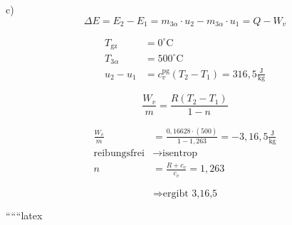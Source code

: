 c) 
\[
\Delta E = E_2 - E_1 = m_{3\alpha} \cdot u_2 - m_{3\alpha} \cdot u_1 = Q - W_v
\]

\begin{align*}
T_{\text{gz}} &= 0^\circ \text{C} \\
T_{3\alpha} &= 500^\circ \text{C} \\
u_2 - u_1 &= c_v^{\text{pg}} (T_2 - T_1) = 316,5 \frac{\text{J}}{\text{kg}}
\end{align*}

\[
\frac{W_v}{m} = \frac{R(T_2 - T_1)}{1 - n}
\]

\begin{align*}
\frac{W_v}{m} &= \frac{0,16628 \cdot (500)}{1 - 1,263} = -3,16,5 \frac{\text{J}}{\text{kg}} \\
\text{reibungsfrei} &\rightarrow \text{isentrop} \\
n &= \frac{R + c_v}{c_v} = 1,263
\end{align*}

\[
\Rightarrow \text{ergibt 3,16,5}
\]

``````latex